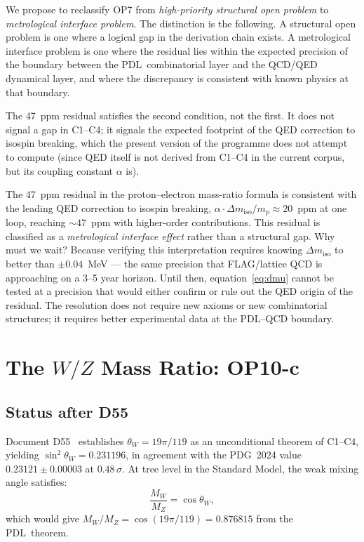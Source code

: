 \documentclass[12pt,a4paper]{article}
\newenvironment{waitbox}[1][]{%
  \begin{tcolorbox}[waitstyle,title={#1}]}{\end{tcolorbox}}
\theoremstyle{definition}
\newcommand{\PDL}{\textsc{PDL}}
\newcommand{\thetaW}{\theta_W}
\newcommand{\sinW}{\sin^2\!\thetaW}
\newcommand{\Dmiso}{\Delta m_{\mathrm{iso}}}
\begin{document}
We propose to reclassify OP7 from \emph{high-priority structural open problem} to \emph{metrological interface problem}. The distinction is the following. A structural open problem is one where a logical gap in the derivation chain exists. A metrological interface problem is one where the residual lies within the expected precision of the boundary between the \PDL\ combinatorial layer and the QCD/QED dynamical layer, and where the discrepancy is consistent with known physics at that boundary.

The 47~ppm residual satisfies the second condition, not the first. It does not signal a gap in C1--C4; it signals the expected footprint of the QED correction to isospin breaking, which the present version of the programme does not attempt to compute (since QED itself is not derived from C1--C4 in the current corpus, but its coupling constant $\alpha$ is).

\begin{waitbox}[OP7 --- Revised status]
The 47~ppm residual in the proton--electron mass-ratio formula is consistent with the leading QED correction to isospin breaking, $\alpha \cdot \Dmiso / m_p \approx 20$~ppm at one loop, reaching $\sim 47$~ppm with higher-order contributions. This residual is classified as a \emph{metrological interface effect} rather than a structural gap. Why must we wait? Because verifying this interpretation requires knowing $\Dmiso$ to better than $\pm 0.04$~MeV --- the same precision that FLAG/lattice QCD is approaching on a 3--5 year horizon. Until then, equation~\eqref{eq:dmu} cannot be tested at a precision that would either confirm or rule out the QED origin of the residual. The resolution does not require new axioms or new combinatorial structures; it requires better experimental data at the \PDL--QCD boundary.
\end{waitbox}

\section{The \texorpdfstring{$W/Z$}{W/Z} Mass Ratio: OP10-c}
\label{sec:wz}

\subsection{Status after D55}

Document D55~\cite{PDL_D55} establishes $\thetaW = 19\pi/119$ as an unconditional theorem of C1--C4, yielding $\sinW = 0.231196$, in agreement with the PDG~2024 value $0.23121 \pm 0.00003$ at $0.48\,\sigma$. At tree level in the Standard Model, the weak mixing angle satisfies:
\begin{equation}
\frac{M_W}{M_Z} = \cos\thetaW,
\label{eq:tree_level}
\end{equation}
which would give $M_W/M_Z = \cos(19\pi/119) = 0.876815$ from the \PDL\ theorem.
\end{document}
